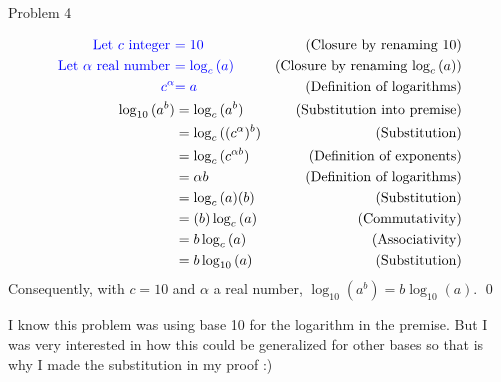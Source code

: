 \begin{problem}{Problem 4}
\begin{Highlight}[Solution]
        \begin{align*}
            \textcolor{blue}{\text{Let } c \text{ integer }} & \textcolor{blue}{ = 10} & \text{(Closure by renaming $10$)} \\
            \textcolor{blue}{\text{Let } \alpha \text{ real number }} & \textcolor{blue}{ = \log_{c}{(a)}} & \text{(Closure by renaming $\log_{c}{(a)}$)} \\
            \textcolor{blue}{c^{\alpha}} & \textcolor{blue}{= a} & \text{(Definition of logarithms)} \\
            \log_{10}{(a^{b})} & = \log_{c}{(a^{b})} & \text{(Substitution into premise)} \\
            & = \log_{c}{((c^{\alpha})^{b})} & \text{(Substitution)} \\
            & = \log_{c}{(c^{\alpha b})} & \text{(Definition of exponents)} \\
            & = \alpha b & \text{(Definition of logarithms)} \\
            & = \log_{c}{(a)}(b) & \text{(Substitution)} \\
            & = (b)\log_{c}{(a)} & \text{(Commutativity)} \\
            & = b\log_{c}{(a)} & \text{(Associativity)} \\
            & = b\log_{10}{(a)} & \text{(Substitution)}
        \end{align*}
        Consequently, with $c = 10$ and $\alpha$ a real number, $\log_{10}{(a^{b})} = b \log_{10}{(a)}$. \qed  
    \end{Highlight}

    \begin{Highlight}[Notes]
        I know this problem was using base 10 for the logarithm in the premise. But I was very interested in how this could be generalized for other bases so that is why I made the substitution in my
        proof :)
    \end{Highlight}
\end{problem}


